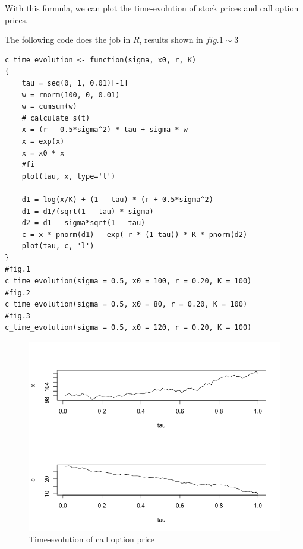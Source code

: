 \documentclass[12pt,a4paper]{paper}
\begin{document}
With this formula, we can plot the time-evolution of stock prices and call option prices.\par
The following code does the job in $R$, results shown in $fig.1 \sim 3$
\begin{verbatim}
c_time_evolution <- function(sigma, x0, r, K)
{
    tau = seq(0, 1, 0.01)[-1]
    w = rnorm(100, 0, 0.01)
    w = cumsum(w)
    # calculate s(t)
    x = (r - 0.5*sigma^2) * tau + sigma * w
    x = exp(x)
    x = x0 * x
    #fi
    plot(tau, x, type='l')
    
    d1 = log(x/K) + (1 - tau) * (r + 0.5*sigma^2)
    d1 = d1/(sqrt(1 - tau) * sigma)
    d2 = d1 - sigma*sqrt(1 - tau)
    c = x * pnorm(d1) - exp(-r * (1-tau)) * K * pnorm(d2)
    plot(tau, c, 'l')
}
#fig.1
c_time_evolution(sigma = 0.5, x0 = 100, r = 0.20, K = 100)
#fig.2
c_time_evolution(sigma = 0.5, x0 = 80, r = 0.20, K = 100)
#fig.3
c_time_evolution(sigma = 0.5, x0 = 120, r = 0.20, K = 100)
\end{verbatim}

\begin{figure}[H]
\caption{Time-evolution of call option price}
\includegraphics[scale = 0.6]{figure1.png}
\end{figure}
\end{document}
